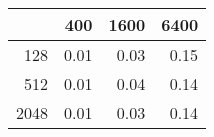 \begin{table}[ht]
\centering
\begin{tabular}{rrrr}
  \hline
 & 400 & 1600 & 6400 \\ 
  \hline
128 & 0.01 & 0.03 & 0.15 \\ 
  512 & 0.01 & 0.04 & 0.14 \\ 
  2048 & 0.01 & 0.03 & 0.14 \\ 
   \hline
\end{tabular}
\end{table}
